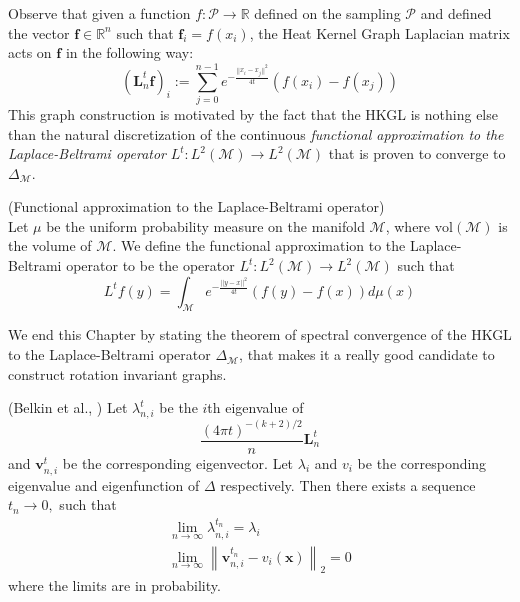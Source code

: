 Observe that given a function $f: \mathcal P \rightarrow \mathbb R$ defined on the sampling $ \mathcal P$ and defined the vector $\mathbf f\in\mathbb R^n$ such that $\mathbf f_i = f(x_i)$, the Heat Kernel Graph Laplacian matrix acts on $\mathbf f$ in the following way:
\begin{equation}\label{eq:HKGL}
(\mathbf L_n^t \mathbf f)_i:=  \sum_{j=0}^{n-1} e^{-\frac{||x_i-x_j||^2}{4t}}\left(f(x_i)-f(x_j)\right)
\end{equation}
This graph construction is motivated by the fact that the HKGL is nothing else than the natural discretization of the continuous \textit{functional approximation to the Laplace-Beltrami operator} $L^t:  L^{2}(\mathcal{M}) \rightarrow L^{2}(\mathcal{M})$ that is proven to converge to $\Delta_\mathcal M$.
\vspace{0.5cm}
\begin{definition}{}(\cite[Belkin et al.]{Belkin:2005:TTF:2138147.2138189}Functional approximation to the Laplace-Beltrami operator)\\ \label{eq: my L^t} Let $\mu$ be the uniform probability measure on the manifold $\mathcal M$, where $\text{vol}(\mathcal M)$ is the volume of $\mathcal M$. We define the functional approximation to the Laplace-Beltrami operator to be the operator $L^t: L^{2}(\mathcal{M}) \rightarrow L^{2}(\mathcal{M})$ such that
	\label{def:Functional approximation to the Laplace-Beltrami operator}
	$$ L^tf(y) = \int_{\mathcal M}e^{-\frac{||y-x||^2}{4t}}\left(f(y)-f(x)\right)d\mu(x)$$
\end{definition}
We end this Chapter by stating the theorem of spectral convergence of the HKGL to the Laplace-Beltrami operator $\Delta_\mathcal M$, that makes it a really good candidate to construct rotation invariant graphs.
\vspace{0.5cm}
\begin{snugshade*}
	\begin{theorem}(Belkin et al., \cite{NIPS2006_2989})\label{theo:spectral convergence}
		Let \(\lambda_{n, i}^{t}\) be the $i$th eigenvalue of 
		$$
		\frac{(4\pi t)^{-(k+2)/2}}{n}\mathbf L^t_n
		$$
		and \(\mathbf v_{n, i}^{t}\) be the corresponding eigenvector. Let \(\lambda_{i}\) and \(v_{i}\) be the corresponding eigenvalue and eigenfunction of \(\Delta\) respectively. Then there exists a sequence \(t_{n} \rightarrow 0,\) such that
		\begin{equation}
		\begin{array}{c}{\lim _{n \rightarrow \infty} \lambda_{n, i}^{t_{n}}=\lambda_{i}} \\ 
		{\lim _{n \rightarrow \infty}\left\|\mathbf v_{n, i}^{t_{n}}-v_{i}(\mathbf x)\right\|_{2}=0}\end{array}
		\end{equation}
		where the limits are in probability.
	\end{theorem}
\end{snugshade*}




